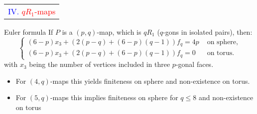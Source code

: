 \documentclass[%
pdf,
colorBG,
slideColor,
]{prosper}
\begin{document}
\begin{slide}{}
\begin{center}
{\Huge 
\begin{tabular*}{7cm}{c}
\\[-0.5cm]
\textcolor{blue}{IV. }\textcolor{red}{$qR_1$-maps}
\end{tabular*}
}
\end{center}
\end{slide}



\begin{slide}{Euler formula}
If $P$ is a $(p,q)$-map, which is $qR_1$ ($q$-gons in isolated pairs), then:
\begin{equation*}
\left\lbrace\begin{array}{rl}
(6-p)x_3+(2(p-q)+(6-p)(q-1) )f_q=4p  &\mbox{~on~sphere},\\
(6-p)x_3+(2(p-q)+(6-p)(q-1) )f_q=0   &\mbox{~on~torus}.
\end{array}\right.
\end{equation*}
with $x_3$ being the number of vertices included in three $p$-gonal faces.

\begin{itemize}
\item For $(4,q)$-maps this yields finiteness on sphere and non-existence
on torus. 
\item For $(5,q)$-maps this implies finiteness on sphere for $q\leq 8$ and non-existence on torus
\end{itemize}

\end{slide}
\end{document}
